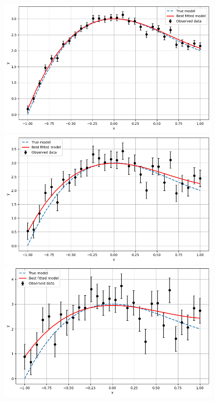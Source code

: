 \begin{figure}[htbp]
\centering
\begin{minipage}{0.47\textwidth}
    \centering
    \includegraphics[width=\linewidth]{MSc_Statistics_Research_Report_Template/images/n=30, sigma=0.1.png}
\end{minipage}
\begin{minipage}{0.47\textwidth}
    \centering
    \includegraphics[width=\linewidth]{MSc_Statistics_Research_Report_Template/images/n=30, sigma=0.3.png}
\end{minipage}
\begin{minipage}{0.47\textwidth}
    \centering
    \includegraphics[width=\linewidth]{MSc_Statistics_Research_Report_Template/images/n=30, sigma=0.5.png} 

\end{minipage}
\end{figure}
